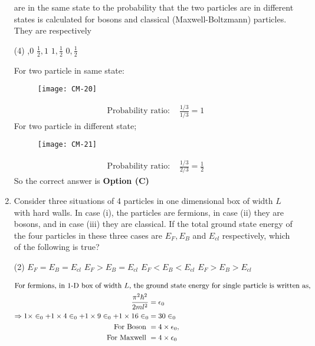 \begin{enumerate}
are in the same state to the probability that the two particles are in different states is calculated for bosons and classical (Maxwell-Boltzmann) particles. They are respectively
{}
\begin{tasks}(4)
,0
\task[\textbf{B.}]  $\frac{1}{2}, 1$
\task[\textbf{C.}] $1, \frac{1}{2}$
\task[\textbf{D.}] $0, \frac{1}{2}$
\end{tasks}
\begin{answer}
For two particle in same state:\\
\begin{figure}[H]
	\centering
	\texttt{[image: CM-20]}
\end{figure}
\begin{align*}
\text{Probability ratio: }&\frac{1 / 3}{1 / 3}=1
\end{align*}
For two particle in different state;
\begin{figure}[H]
	\centering
	\texttt{[image: CM-21]}
\end{figure}
\begin{align*}
\text{Probability ratio: }&\frac{1 / 3}{2 / 3}=\frac{1}{2}
\end{align*}
So the correct answer is \textbf{Option (C)}
\end{answer}
	\item Consider three situations of 4 particles in one dimensional box of width $L$ with hard walls. In case (i), the particles are fermions, in case (ii) they are bosons, and in case (iii) they are classical. If the total ground state energy of the four particles in these three cases are $E_{F}, E_{B}$ and $E_{c l}$ respectively, which of the following is true?
{	}
\begin{tasks}(2)
\task[\textbf{A.}] $E_{F}=E_{B}=E_{c l}$
\task[\textbf{B.}] $E_{F}>E_{B}=E_{c l}$
\task[\textbf{C.}] $E_{F}<E_{B}<E_{c l}$
\task[\textbf{D.}] $E_{F}>E_{B}>E_{c l}$
\end{tasks}
\begin{answer}
\begin{align*}
\intertext{For fermions, in 1-D box of width $L$, the ground state energy for single particle is written as,}
\frac{\pi^{2} \hbar^{2}}{2 m l^{2}}&=\epsilon_{0}\\
\Rightarrow 1 \times \in_{0}+1 \times 4 \in_{0}+1 \times 9 \in_{0}+1 \times 16 \in_{0}&=30 \in_{0}\\
\text{ For Boson }&=4 \times \epsilon_{0},\\\text{ For Maxwell }&=4 \times \epsilon_{0}\\

\end{align*}
\end{answer}
\end{enumerate}
